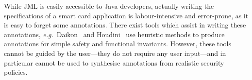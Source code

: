 


While JML is easily accessible to Java developers, actually writing
the specifications of a smart card application is labour-intensive and
error-prone, as it is easy to forget some annotations. There
exist tools which assist in writing these annotations,
\emph{e.g.}~Daikon~\cite{ErnstCGN2001:TSE} and Houdini~\cite{FlanaganL01}
use heuristic methods to produce annotations for simple safety and
functional invariants.  However, these tools cannot be guided by the
user---they do not require any user input---and in particular cannot
be used to synthesise annotations from realistic security policies.

